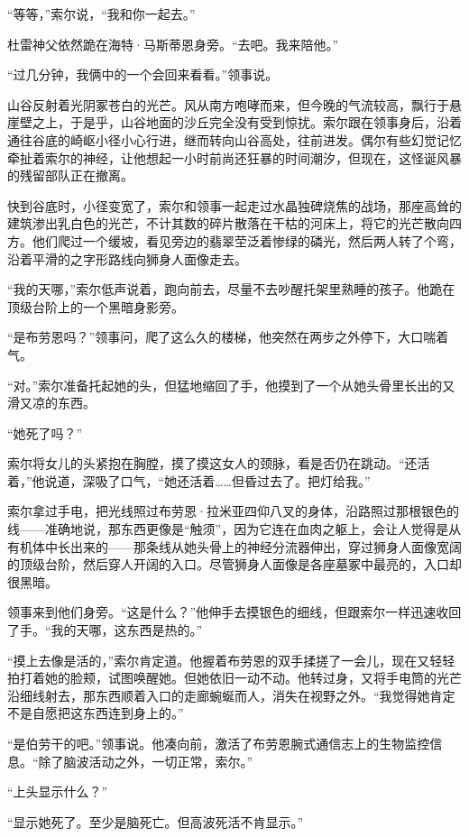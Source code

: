 \documentclass[AutoFakeBold=true]{book}
\begin{document}
``等等，''索尔说，``我和你一起去。''

杜雷神父依然跪在海特·马斯蒂恩身旁。``去吧。我来陪他。''

``过几分钟，我俩中的一个会回来看看。''领事说。

山谷反射着光阴冢苍白的光芒。风从南方咆哮而来，但今晚的气流较高，飘行于悬崖壁之上，于是乎，山谷地面的沙丘完全没有受到惊扰。索尔跟在领事身后，沿着通往谷底的崎岖小径小心行进，继而转向山谷高处，往前进发。偶尔有些{\kaishu 幻觉记忆}牵扯着索尔的神经，让他想起一小时前尚还狂暴的时间潮汐，但现在，这怪诞风暴的残留部队正在撤离。

快到谷底时，小径变宽了，索尔和领事一起走过水晶独碑烧焦的战场，那座高耸的建筑渗出乳白色的光芒，不计其数的碎片散落在干枯的河床上，将它的光芒散向四方。他们爬过一个缓坡，看见旁边的翡翠茔泛着惨绿的磷光，然后两人转了个弯，沿着平滑的之字形路线向狮身人面像走去。

``我的天哪，''索尔低声说着，跑向前去，尽量不去吵醒托架里熟睡的孩子。他跪在顶级台阶上的一个黑暗身影旁。

``是布劳恩吗？''领事问，爬了这么久的楼梯，他突然在两步之外停下，大口喘着气。

``对。''索尔准备托起她的头，但猛地缩回了手，他摸到了一个从她头骨里长出的又滑又凉的东西。

``她死了吗？''

索尔将女儿的头紧抱在胸膛，摸了摸这女人的颈脉，看是否仍在跳动。``还活着，''他说道，深吸了口气，``她还活着……但昏过去了。把灯给我。''

索尔拿过手电，把光线照过布劳恩·拉米亚四仰八叉的身体，沿路照过那根银色的线——准确地说，那东西更像是``触须''，因为它连在血肉之躯上，会让人觉得是从有机体中长出来的——那条线从她头骨上的神经分流器伸出，穿过狮身人面像宽阔的顶级台阶，然后穿人开阔的入口。尽管狮身人面像是各座墓冢中最亮的，入口却很黑暗。

领事来到他们身旁。``这是什么？''他伸手去摸银色的细线，但跟索尔一样迅速收回了手。``我的天哪，这东西是热的。''

``摸上去像是活的，''索尔肯定道。他握着布劳恩的双手揉搓了一会儿，现在又轻轻拍打着她的脸颊，试图唤醒她。但她依旧一动不动。他转过身，又将手电筒的光芒沿细线射去，那东西顺着入口的走廊蜿蜒而人，消失在视野之外。``我觉得她肯定不是自愿把这东西连到身上的。''

``是伯劳干的吧。''领事说。他凑向前，激活了布劳恩腕式通信志上的生物监控信息。``除了脑波活动之外，一切正常，索尔。''

``上头显示什么？''

``显示她死了。至少是脑死亡。但高波死活不肯显示。''
\end{document}
